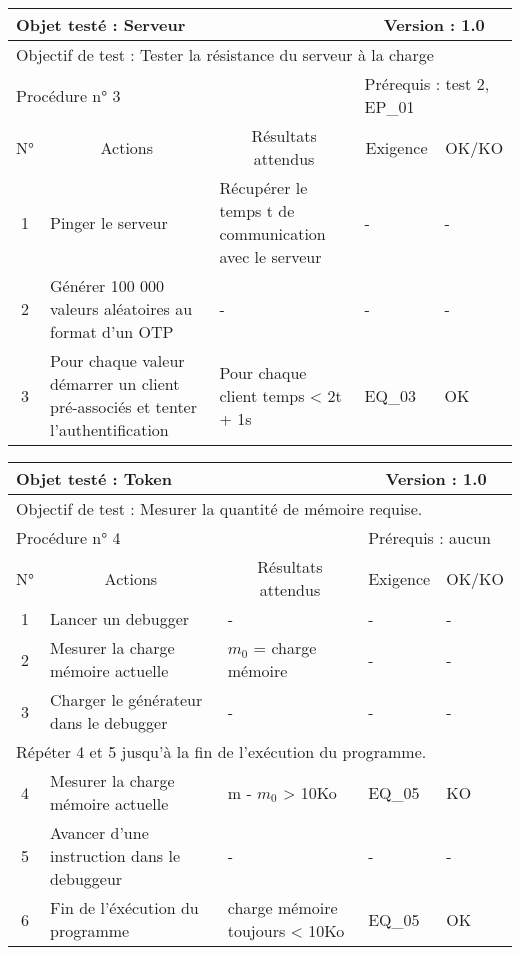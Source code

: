 \documentclass{"../../res/univ-projet"}
\begin{document}
\begin{center}
    \begin{tabular}{|c|p{5cm}|p{5cm}|p{1.5cm}|p{1.5cm}|}
      \hline
      \multicolumn{3}{|l|}{Objet testé : Serveur} & \multicolumn{2}{c|}{Version : 1.0}\\ \hline
      \multicolumn{5}{|l|}{Objectif de test : Tester la résistance du serveur à la charge}\\ \hline
      \multicolumn{3}{|l|}{Procédure n° 3} & \multicolumn{2}{p{3cm}|}{Prérequis : test 2, EP\_01}\\ \hline
      \multicolumn{1}{|c|}{N°} & \multicolumn{1}{c|}{Actions} & \multicolumn{1}{c|}{Résultats attendus} & 
      \multicolumn{1}{c|}{Exigence} & \multicolumn{1}{c|}{OK/KO}\\ \hline
      1 & Pinger le serveur & Récupérer le temps t de communication avec le serveur & - & - \\
      2 & Générer 100 000 valeurs aléatoires au format d'un OTP & - & - & -\\
      3 & Pour chaque valeur démarrer un client pré-associés et tenter l'authentification & Pour chaque client temps < 2t + 1s & EQ\_03 & OK\\ \hline
    \end{tabular}
    
    \begin{tabular}{|c|p{5cm}|p{5cm}|p{1.5cm}|p{1.5cm}|}
      \hline
      \multicolumn{3}{|l|}{Objet testé : Token} & \multicolumn{2}{c|}{Version : 1.0}\\ \hline
      \multicolumn{5}{|l|}{Objectif de test : Mesurer la quantité de mémoire requise.}\\ \hline
      \multicolumn{3}{|l|}{Procédure n° 4} & \multicolumn{2}{p{3cm}|}{Prérequis : aucun}\\ \hline
      \multicolumn{1}{|c|}{N°} & \multicolumn{1}{c|}{Actions} & \multicolumn{1}{c|}{Résultats attendus} & 
      \multicolumn{1}{c|}{Exigence} & \multicolumn{1}{c|}{OK/KO}\\ \hline
      1 & Lancer un debugger & - & - & - \\
      2 & Mesurer la charge mémoire actuelle & $m_0$ = charge mémoire & - & -\\
      3 & Charger le générateur dans le debugger & - & - & -\\
      \hline
      \multicolumn{5}{|l|}{Répéter 4 et 5 jusqu'à la fin de l'exécution du programme.}\\
      \hline
      4 & Mesurer la charge mémoire actuelle & m - $m_0$ > 10Ko & EQ\_05 & KO\\
      5 & Avancer d'une instruction dans le debuggeur & - & - & -\\ \hline
      6 & Fin de l'éxécution du programme & charge mémoire toujours < 10Ko & EQ\_05 & OK \\ \hline
    \end{tabular}
    

\end{center}
\end{document}
